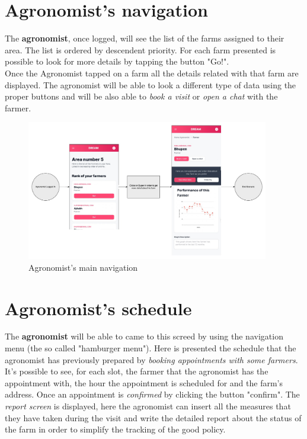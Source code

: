 \documentclass[10pt]{report}
\begin{document}
\section{Agronomist's navigation}
The \textbf{agronomist}, once logged, will see the list of the farms assigned to their area. The list is ordered by descendent priority. For each farm presented is possible to look for more details by tapping the button "Go!". \\
Once the Agronomist tapped on a farm all the details related with that farm are displayed. The agronomist will be able to look a different type of data using the proper buttons and will be also able to \textit{book a visit} or \textit{open a chat} with the farmer.

\begin{figure}[H]
    \centering
    \includegraphics[width=400px]{Mockups/MockUpDiagram-DetailFarmAgronomist.jpg}
    \caption{Agronomist's main navigation}
\end{figure}

\section{Agronomist's schedule}
The \textbf{agronomist} will be able to came to this screed by using the navigation menu (the so called "hamburger menu"). Here is presented the schedule that the agronomist has previously prepared by \textit{booking appointments with some farmers}. It's possible to see, for each slot, the farmer that the agronomist has the appointment with, the hour the appointment is scheduled for and the farm's address.
Once an appointment is \textit{confirmed} by clicking the button "confirm". The \textit{report screen} is displayed, here the agronomist can insert all the measures that they have taken during the visit and write the detailed report about the status of the farm in order to simplify the tracking of the good policy. 
\end{document}
